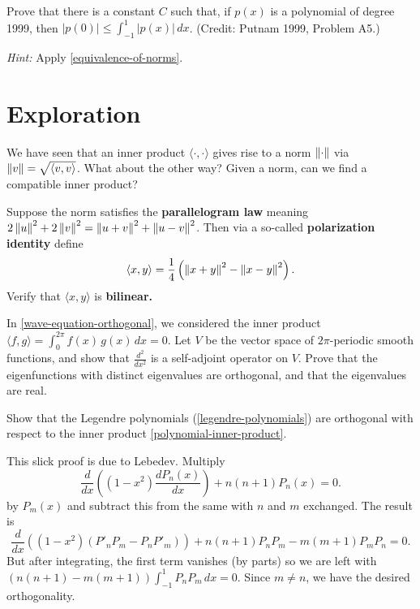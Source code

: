 \documentclass{homework}
\begin{document}
\begin{problem}
  Prove that there is a constant $C$  such that,  if  $p(x)$  is a polynomial of degree 1999,  then  $|p(0)| \leq \displaystyle\int_{-1}^1 \left|p(x)\right| \, dx$. (Credit: Putnam 1999, Problem A5.)
  
  \textit{Hint:} Apply \ref{equivalence-of-norms}.
\end{problem}

\section{Exploration}

\begin{problem}
  We have seen that an inner product $\langle \cdot,\cdot\rangle$
  gives rise to a norm $\left\lVert\cdot\right\rVert$ via
  $\left\lVert v\right\rVert = \sqrt{\langle v, v \rangle}$.  What about the other way?
  Given a norm, can we find a compatible inner product?

  Suppose the norm satisfies the \textbf{parallelogram law} meaning
  $2 \left\lVert u\right\rVert^2 + 2 \left\lVert v\right\rVert^2 = \left\lVert u+v\right\rVert^2 + \left\lVert u-v\right\rVert^2$.
  Then via a so-called \textbf{polarization identity} define \[
    \langle x, y\rangle = \frac{1}{4} \left( \left\lVert x+y\right\rVert^2 - \left\lVert x-y\right\rVert^2 \right).
  \]
  Verify that $\langle x, y\rangle$ is \textbf{bilinear.}
\end{problem}

\begin{problem}
  In \ref{wave-equation-orthogonal}, we considered the inner product
  \( \langle f,g \rangle =
    \displaystyle\int_0^{2\pi} f(x) \, g(x) \, dx = 0. \)
  Let $V$ be the vector space of $2\pi$-periodic smooth functions, and show that $\frac{d^2}{dx^2}$ is a self-adjoint operator on $V$.  Prove that the eigenfunctions with distinct eigenvalues are orthogonal, and that the eigenvalues are real.
\end{problem}

\begin{problem}\label{legendre-orthogonal}Show that the Legendre polynomials (\ref{legendre-polynomials}) are orthogonal with respect to the inner product \eqref{polynomial-inner-product}.
\end{problem}

\begin{solution}
  This slick proof is due to Lebedev.  Multiply
    \[
      \frac{d}{dx}\left(\left(1-x^{2}\right){\frac {d P_{n}(x)}{dx}}\right)+n(n+1)P_{n}(x)=0.
    \]
    by $P_{m}(x)$ and subtract this from the same with $n$ and $m$ exchanged.  The result is
    \[
      \frac{d}{dx}\left(\left(1-x^{2}\right) \left( P'_n P_m - P_n P'_m \right) \right)+n(n+1)P_{n} P_{m} - m(m+1)P_{m} P_{n} =0.
    \]
    But after integrating, the first term vanishes (by parts) so we are left with $\left( n(n+1) - m(m+1) \right) \int_{-1}^1 P_n P_m \, dx = 0$.  Since $m \neq n$, we have the desired orthogonality.
\end{solution}
\end{document}
